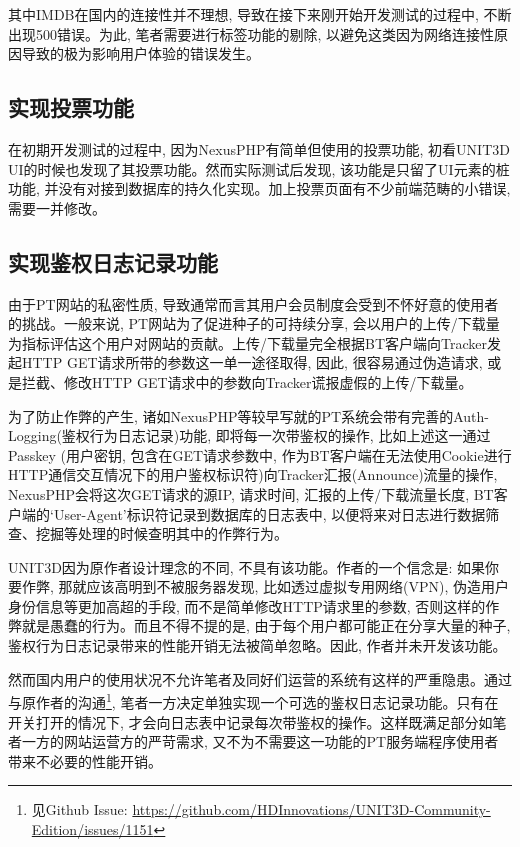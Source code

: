 其中IMDB在国内的连接性并不理想, 导致在接下来刚开始开发测试的过程中, 不断出现500错误。为此, 笔者需要进行标签功能的剔除, 以避免这类因为网络连接性原因导致的极为影响用户体验的错误发生。

\subsection{实现投票功能}

在初期开发测试的过程中, 因为NexusPHP有简单但使用的投票功能, 初看UNIT3D UI的时候也发现了其投票功能。然而实际测试后发现, 该功能是只留了UI元素的桩功能, 并没有对接到数据库的持久化实现。加上投票页面有不少前端范畴的小错误, 需要一并修改。

\subsection{实现鉴权日志记录功能}
\label{subsec:auth}

由于PT网站的私密性质, 导致通常而言其用户会员制度会受到不怀好意的使用者的挑战。一般来说, PT网站为了促进种子的可持续分享, 会以用户的上传/下载量为指标评估这个用户对网站的贡献。上传/下载量完全根据BT客户端向Tracker发起HTTP GET请求所带的参数这一单一途径取得, 因此, 很容易通过伪造请求, 或是拦截、修改HTTP GET请求中的参数向Tracker谎报虚假的上传/下载量。

为了防止作弊的产生, 诸如NexusPHP等较早写就的PT系统会带有完善的Auth-Logging(鉴权行为日志记录)功能, 即将每一次带鉴权的操作, 比如上述这一通过Passkey (用户密钥, 包含在GET请求参数中, 作为BT客户端在无法使用Cookie进行HTTP通信交互情况下的用户鉴权标识符)向Tracker汇报(Announce)流量的操作, NexusPHP会将这次GET请求的源IP, 请求时间, 汇报的上传/下载流量长度, BT客户端的`User-Agent'标识符记录到数据库的日志表中, 以便将来对日志进行数据筛查、挖掘等处理的时候查明其中的作弊行为。

UNIT3D因为原作者设计理念的不同, 不具有该功能。作者的一个信念是: 如果你要作弊, 那就应该高明到不被服务器发现, 比如透过虚拟专用网络(VPN), 伪造用户身份信息等更加高超的手段, 而不是简单修改HTTP请求里的参数, 否则这样的作弊就是愚蠢的行为。而且不得不提的是, 由于每个用户都可能正在分享大量的种子, 鉴权行为日志记录带来的性能开销无法被简单忽略。因此, 作者并未开发该功能。

然而国内用户的使用状况不允许笔者及同好们运营的系统有这样的严重隐患。通过与原作者的沟通\footnote{见Github Issue: \url{https://github.com/HDInnovations/UNIT3D-Community-Edition/issues/1151}}, 笔者一方决定单独实现一个可选的鉴权日志记录功能。只有在开关打开的情况下, 才会向日志表中记录每次带鉴权的操作。这样既满足部分如笔者一方的网站运营方的严苛需求, 又不为不需要这一功能的PT服务端程序使用者带来不必要的性能开销。





